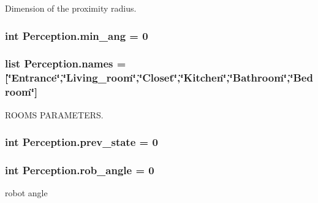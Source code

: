 Dimension of the proximity radius. 

\subsubsection[{\texorpdfstring{min\+\_\+ang}{min_ang}}]{\setlength{\rightskip}{0pt plus 5cm}int Perception.\+min\+\_\+ang = 0}\hypertarget{namespacePerception_a0aca0fa8eb3415fe07777168f37774ff}{}\label{namespacePerception_a0aca0fa8eb3415fe07777168f37774ff}
\subsubsection[{\texorpdfstring{names}{names}}]{\setlength{\rightskip}{0pt plus 5cm}list Perception.\+names = \mbox{[}\char`\"{}Entrance\char`\"{},\char`\"{}Living\+\_\+room\char`\"{},\char`\"{}Closet\char`\"{},\char`\"{}Kitchen\char`\"{},\char`\"{}Bathroom\char`\"{},\char`\"{}Bedroom\char`\"{}\mbox{]}}\hypertarget{namespacePerception_ade020d1959a087b5a07fd0936a5f489d}{}\label{namespacePerception_ade020d1959a087b5a07fd0936a5f489d}


R\+O\+O\+MS P\+A\+R\+A\+M\+E\+T\+E\+RS. 

\subsubsection[{\texorpdfstring{prev\+\_\+state}{prev_state}}]{\setlength{\rightskip}{0pt plus 5cm}int Perception.\+prev\+\_\+state = 0}\hypertarget{namespacePerception_ad34a03e4d4afc6f3f824f912c28692ff}{}\label{namespacePerception_ad34a03e4d4afc6f3f824f912c28692ff}
\subsubsection[{\texorpdfstring{rob\+\_\+angle}{rob_angle}}]{\setlength{\rightskip}{0pt plus 5cm}int Perception.\+rob\+\_\+angle = 0}\hypertarget{namespacePerception_a6f826a3f390ba3a185e2aa8a43013701}{}\label{namespacePerception_a6f826a3f390ba3a185e2aa8a43013701}


robot angle 

